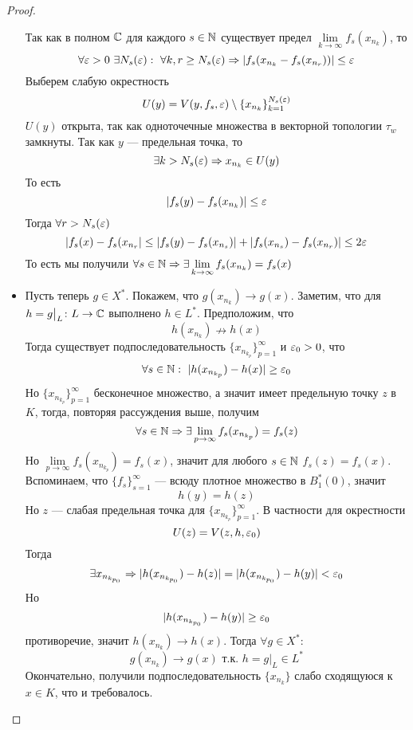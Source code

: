 \begin{proof}
\begin{itemize}
$$		$$
		Так как в полном $\mathbb{C}$ для каждого $s \in \mathbb{N}$ существует предел $\lim\limits_{k\to\infty}f_s(x_{n_k})$, то 
		$$
		\forall \varepsilon > 0 \ \exists N_s(\varepsilon): \ \forall k, r \geq N_s(\varepsilon) \Rightarrow |f_s(x_{n_k} - f_s(x_{n_r}))| \leq \varepsilon 
		$$
		Выберем слабую окрестность 
		$$
		U(y) = V(y,f_s,\varepsilon) \setminus \{x_{n_k}\}_{k=1}^{N_s(\varepsilon)}
		$$
		$U(y)$ открыта, так как одноточечные множества в векторной топологии $\tau_w$ замкнуты. Так как $y$ --- предельная точка, то 
		$$
		\exists k > N_s(\varepsilon) \Rightarrow x_{n_k} \in U(y)
		$$ 
		То есть 
		$$
		|f_s(y) - f_s(x_{n_k})| \leq \varepsilon
		$$
		Тогда $\forall r > N_s(\varepsilon)$
		$$
		|f_s(x) - f_s(x_{n_r}| \leq |f_s(y) - f_s(x_{n_s})| + |f_s(x_{n_s}) - f_s(x_{n_r})| \leq 2\varepsilon 
		$$
		То есть мы получили $\forall s \in \mathbb{N} \Rightarrow \exists \lim\limits_{k\to\infty} f_s(x_{n_k}) = f_s(x)$
		\item  Пусть теперь $g \in X^*$. Покажем, что $g(x_{n_k}) \to g(x)$. Заметим, что для $h = g\big |_ L\colon L \to \mathbb{C} $ выполнено $h \in L^*$. Предположим, что 
		$$
		h(x_{n_k}) \nrightarrow h(x)
		$$
		Тогда существует подпоследовательность $\{x_{n_{k_p}}\}_{p=1}^\infty$ и $\varepsilon_0 > 0$, что  
		$$
		\forall s \in \mathbb{N}: \ |h(x_{n_{k_p}}) - h(x)| \geq \varepsilon_0 
		$$
		Но $\{x_{n_{k_p}}\}_{p=1}^\infty$ бесконечное множество, а значит имеет предельную точку $z$ в $K$, тогда, повторяя рассуждения выше, получим
		$$
		\forall s \in \mathbb{N} \Rightarrow \exists \lim\limits_{p \to \infty} f_s(x_{n_{k_p}}) = f_s(z)
		$$
		Но $\lim\limits_{p \to \infty} f_s(x_{n_{k_p}}) = f_s(x)$, значит для любого $s \in \mathbb{N}$ $f_s(z) = f_s(x)$. Вспоминаем, что $\{f_s\}_{s=1}^\infty$ --- всюду плотное множество в $B_1^*(0)$, значит 
		$$
		h(y) = h(z)
		$$ 
		Но $z$ --- слабая предельная точка для $\{x_{n_{k_p}}\}_{p=1}^\infty$. В частности для окрестности 
		$$
		U(z) = V(z,h,\varepsilon_0)
		$$
		Тогда 
		$$
		\exists x_{n_{k_{p_0}}}\Rightarrow |h(x_{n_{k_{p_0}}}) - h(z)| = |h(x_{n_{k_{p_0}}}) - h(y)| < \varepsilon_0
		$$
		Но 
		$$
		|h(x_{n_{k_{p_0}}}) - h(y)| \geq \varepsilon_0
		$$
		противоречие, значит $h(x_{n_k}) \to h(x)$. Тогда $\forall g \in X^*$: 
		$$
		g(x_{n_k}) \to g(x) \text{ т.к. } h = g\big |_L  \in L^*
		$$
		Окончательно, получили подпоследовательность $\{x_{n_k}\}$ слабо сходящуюся к $x \in K$, что и требовалось.  
	\end{itemize}
	
\end{proof}